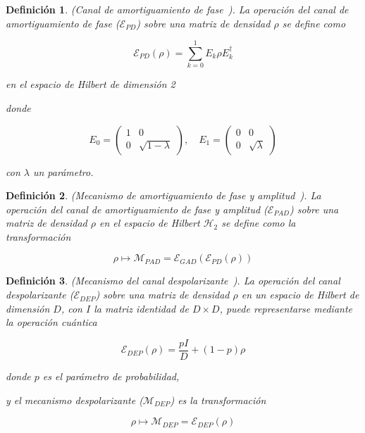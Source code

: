 \documentclass{ieeeaccess}
\newtheorem{definition}{Definición}[section]
\begin{document}
\begin{definition}
    (Canal de amortiguamiento de fase~\cite{zhou2017differential}). La operación del canal de amortiguamiento de fase ($\mathcal{E}_{PD}$) sobre una matriz de densidad $\rho$ se define como

    \[
      \mathcal{E}_{PD}(\rho) = \sum_{k = 0}^{1}E_{k}\rho E_{k}^{\dagger}
    \]

    en el espacio de Hilbert de dimensión 2

    donde

    \[
      E_0 = \begin{pmatrix} 1 & 0 \\ 0 & \sqrt{1-\lambda} \end{pmatrix}, \quad
      E_1 = \begin{pmatrix} 0 & 0 \\ 0 & \sqrt{\lambda} \end{pmatrix}
    \]

    con $\lambda$ un parámetro.
    \label{def:phase_damping}
\end{definition}

\begin{definition}
    (Mecanismo de amortiguamiento de fase y amplitud~\cite{zhou2017differential}). La operación del canal de amortiguamiento de fase y amplitud ($\mathcal{E}_{PAD}$) sobre una matriz de densidad $\rho$ en el espacio de Hilbert $\mathcal{H}_2$ se define como la transformación

    \[
      \rho \mapsto \mathcal{M}_{PAD} = \mathcal{E}_{GAD}(\mathcal{E}_{PD}(\rho))
    \]
    \label{def:pad}
\end{definition}

\begin{definition}
  (Mecanismo del canal despolarizante~\cite{zhou2017differential}). La operación del canal despolarizante ($\mathcal{E}_{DEP}$) sobre una matriz de densidad $\rho$ en un espacio de Hilbert de dimensión $D$, con $I$ la matriz identidad de $D \times D$, puede representarse mediante la operación cuántica

  \[
    \mathcal{E}_{DEP}(\rho) = \frac{pI}{D} + (1-p)\rho
  \]

  donde $p$ es el parámetro de probabilidad,

  y el mecanismo despolarizante ($\mathcal{M}_{DEP}$) es la transformación

  \[
    \rho \mapsto \mathcal{M}_{DEP} = \mathcal{E}_{DEP}(\rho)
  \]
  \label{def:dep}
\end{definition}
\end{document}
